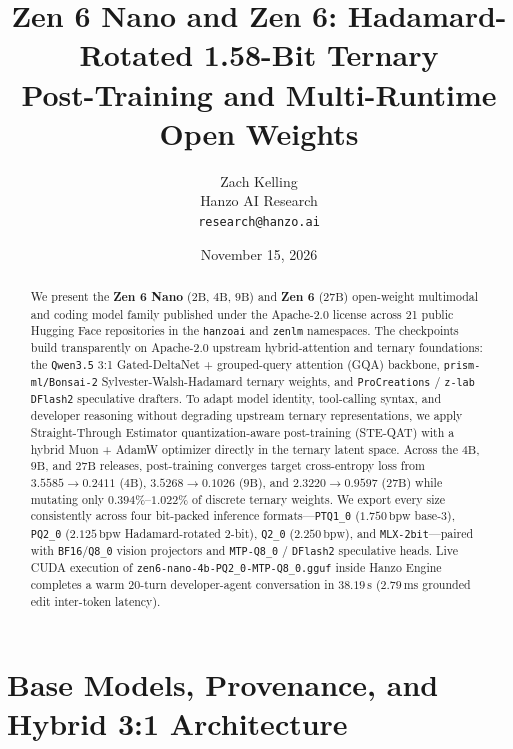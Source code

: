 \documentclass[11pt,a4paper]{article}
\title{\textbf{Zen 6 Nano and Zen 6: Hadamard-Rotated 1.58-Bit Ternary\\Post-Training and Multi-Runtime Open Weights}}
\author{
  Zach Kelling \\
  Hanzo AI Research \\
  \texttt{research@hanzo.ai}
}
\date{November 15, 2026}
\begin{document}
\maketitle

\begin{abstract}
We present the \textbf{Zen 6 Nano} ($2\text{B}$, $4\text{B}$, $9\text{B}$) and \textbf{Zen 6} ($27\text{B}$) open-weight multimodal and coding model family published under the Apache-2.0 license across 21 public Hugging Face repositories in the \texttt{hanzoai} and \texttt{zenlm} namespaces. The checkpoints build transparently on Apache-2.0 upstream hybrid-attention and ternary foundations: the \texttt{Qwen3.5} 3:1 Gated-DeltaNet + grouped-query attention (GQA) backbone, \texttt{prism-ml/Bonsai-2} Sylvester-Walsh-Hadamard ternary weights, and \texttt{ProCreations} / \texttt{z-lab} \texttt{DFlash2} speculative drafters. To adapt model identity, tool-calling syntax, and developer reasoning without degrading upstream ternary representations, we apply Straight-Through Estimator quantization-aware post-training (STE-QAT) with a hybrid Muon + AdamW optimizer directly in the ternary latent space. Across the $4\text{B}$, $9\text{B}$, and $27\text{B}$ releases, post-training converges target cross-entropy loss from $3.5585 \to 0.2411$ ($4\text{B}$), $3.5268 \to 0.1026$ ($9\text{B}$), and $2.3220 \to 0.9597$ ($27\text{B}$) while mutating only $0.394\%$--$1.022\%$ of discrete ternary weights. We export every size consistently across four bit-packed inference formats---\texttt{PTQ1\_0} ($1.750\,\text{bpw}$ base-3), \texttt{PQ2\_0} ($2.125\,\text{bpw}$ Hadamard-rotated 2-bit), \texttt{Q2\_0} ($2.250\,\text{bpw}$), and \texttt{MLX-2bit}---paired with \texttt{BF16}/\texttt{Q8\_0} vision projectors and \texttt{MTP-Q8\_0} / \texttt{DFlash2} speculative heads. Live CUDA execution of \texttt{zen6-nano-4b-PQ2\_0-MTP-Q8\_0.gguf} inside Hanzo Engine completes a warm 20-turn developer-agent conversation in $38.19\,\text{s}$ ($2.79\,\text{ms}$ grounded edit inter-token latency).
\end{abstract}

\section{Base Models, Provenance, and Hybrid 3:1 Architecture}
\end{document}
